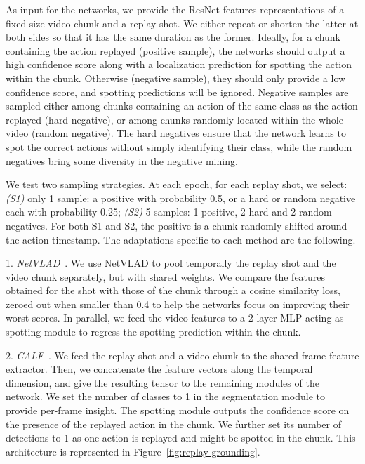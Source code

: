 \documentclass[final]{cvsports}
\begin{document}
As input for the networks, we provide the ResNet features representations of a fixed-size video chunk and a replay shot. We either repeat or shorten the latter at both sides so that it has the same duration as the former. Ideally, for a chunk containing the action replayed (positive sample), the networks should output a high confidence score along with a localization prediction for spotting the action within the chunk. Otherwise (negative sample), they should only provide a low confidence score, and spotting predictions will be ignored. Negative samples are sampled either among chunks containing an action of the same class as the action replayed (hard negative), or among chunks randomly located within the whole video (random negative). 
The hard negatives ensure that the network learns to spot the correct actions without simply identifying their class, while the random negatives bring some diversity in the negative mining. 


We test two sampling strategies. At each epoch, for each replay shot, we select: \emph{(S1)} only 1 sample: a positive with probability 0.5, or a hard or random negative each with probability 0.25; \emph{(S2)} 5 samples: 1 positive, 2 hard and 2 random negatives. For both S1 and S2, the positive is a chunk randomly shifted around the action timestamp.
The adaptations specific to each method are the following.

1. \emph{NetVLAD}~\cite{Giancola_2018_CVPR_Workshops}. We use NetVLAD to pool temporally the replay shot and the video chunk separately, but with shared weights. We compare the features obtained for the shot with those of the chunk through a cosine similarity loss, zeroed out when smaller than 0.4 to help the networks focus on improving their worst scores. In parallel, we feed the video features to a 2-layer MLP acting as spotting module to regress the spotting prediction within the chunk.   

2. \emph{CALF}~\cite{cioppa2020context}. We feed the replay shot and a video chunk to the shared frame feature extractor. Then, we concatenate the feature vectors along the temporal dimension, and give the resulting tensor to the remaining modules of the network. We set the number of classes to 1 in the segmentation module to provide per-frame insight. The spotting module outputs the confidence score on the presence of the replayed action in the chunk. We further set its number of detections to 1 as one action is replayed and might be spotted in the chunk. This architecture is represented in Figure~\ref{fig:replay-grounding}.
\end{document}
